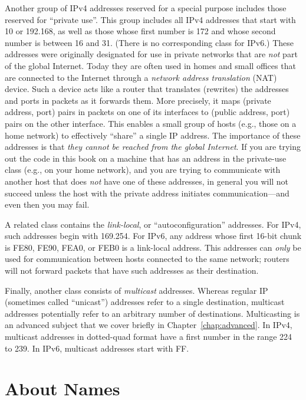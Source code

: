 Another group of IPv4 addresses reserved for a special purpose
includes those reserved for ``private use''.
This group includes all IPv4 addresses that start with
10 or 192.168, as well as those whose first number is 172 and whose
second number is between 16 and 31.  (There is no corresponding class
for IPv6.)
These addresses were originally designated for use in private networks
that are \emph{not\/} part of the global Internet.
Today they are often used in homes and small offices that are connected 
to the Internet through a \emph{network address translation\/} (NAT)\cite{RFC3022}
device.  Such a device acts like a router that
translates (rewrites) the addresses and ports
in packets as it forwards them.  More precisely, it maps
(private address, port) pairs in packets on one of its interfaces
to (public address, port) pairs on the other interface.
This enables a small group of hosts (e.g., those on a home network) to
effectively ``share'' a single IP address.
The importance of these addresses is that \emph{they cannot be reached
from the global Internet}.  If you are trying out the code in
this book on a machine that has an address in the private-use class
(e.g., on your home network),
and you are trying to communicate with another host that does
\emph{not\/} have one of these addresses, in general you will not
succeed unless the host with the private address initiates
communication---and even then you may fail.

A related class contains the \emph{link-local}, or
 ``autoconfiguration'' addresses.  For IPv4, such addresses
begin with 169.254.  For  IPv6, any address whose first 16-bit chunk is
FE80, FE90, FEA0, or FEB0 is a link-local address.
This addresses can \emph{only\/} be used for communication between
hosts connected to the same network; routers will not forward packets
that have such addresses as their destination.

Finally, another class consists of \emph{multicast}
addresses.  Whereas regular IP (sometimes called
``unicast'') addresses refer to a single destination, multicast
addresses potentially refer to an arbitrary number of destinations.
%
Multicasting is an advanced subject that we cover briefly in
Chapter~\ref{chap:advanced}.  In IPv4, multicast addresses in
dotted-quad format have a first number in the range 224 to 239.
In IPv6, multicast addresses start with FF.

\section{About Names}

